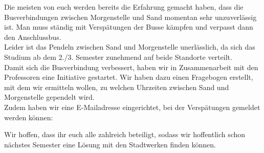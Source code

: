 Die meisten von euch werden bereits die Erfahrung gemacht haben, dass die Busverbindungen zwischen Morgenstelle und Sand momentan sehr unzuverlässig ist. Man muss ständig mit Verspätungen der Busse kämpfen und verpasst dann den Anschlussbus.\\
Leider ist das Pendeln zwischen Sand und Morgenstelle unerlässlich, da sich das Studium ab dem 2./3. Semester zunehmend auf beide Standorte verteilt.\\
Damit sich die Busverbindung verbessert, haben wir in  Zusammenarbeit mit den Professoren eine Initiative gestartet. Wir haben dazu einen Fragebogen erstellt, mit dem wir ermitteln wollen, zu welchen Uhrzeiten zwischen Sand und Morgenstelle gependelt wird.\\
Zudem haben wir eine E-Mailadresse eingerichtet, bei der Verspätungen gemeldet werden können: 

Wir hoffen, dass ihr euch alle zahlreich beteiligt, sodass wir hoffentlich schon nächstes Semester eine Lösung mit den Stadtwerken finden können.